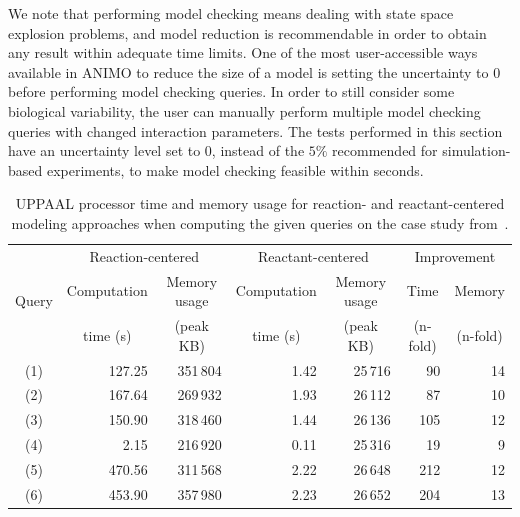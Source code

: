 \documentclass{llncs}
\begin{document}
We note that performing model checking means dealing with state space explosion problems,
and model reduction is recommendable in order to obtain any result within adequate time limits. One of the
most user-accessible ways available in ANIMO to reduce the size of a model is setting the uncertainty to 0
before performing model checking queries.
In order to still consider some biological variability, the user can manually perform multiple model checking queries with changed interaction parameters.
The tests performed in this section have an uncertainty level set to 0, instead of the $5\%$ recommended for simulation-based experiments, to
make model checking feasible within seconds.


\begin{table}[htbp]
  \begin{center}
    \begin{tabular}{|c||r|r||r|r||r|r|}
      \hline
       \multirow{3}{*}{Query} & \multicolumn{2}{c||}{Reaction-centered}	   & \multicolumn{2}{c||}{Reactant-centered} & \multicolumn{2}{c|}{Improvement}\\
      \cline{2-7}
       & \multicolumn{1}{c|}{Computation} & \multicolumn{1}{c||}{Memory usage} & \multicolumn{1}{c|}{Computation} & \multicolumn{1}{c||}{Memory usage} & \multicolumn{1}{c|}{Time} & \multicolumn{1}{c|}{Memory} \\
       & \multicolumn{1}{c|}{time (s)}    & \multicolumn{1}{c||}{(peak KB)}    & \multicolumn{1}{c|}{time (s)} & \multicolumn{1}{c||}{(peak KB)} & \multicolumn{1}{c|}{(n-fold)} & \multicolumn{1}{c|}{(n-fold)}\\
      \hline
      \hline
      (1) & 127.25 & 351\,{}804 & 1.42 & 25\,{}716 & 90 & 14 \\
      \hline
      (2) & 167.64 & 269\,{}932 & 1.93 & 26\,{}112 & 87 & 10 \\
      \hline
      (3) & 150.90 & 318\,{}460 & 1.44 & 26\,{}136 & 105 & 12 \\
      \hline
      (4) & 2.15 & 216\,{}920 & 0.11 & 25\,{}316 & 19 & 9 \\
      \hline
      (5) & 470.56 & 311\,{}568 & 2.22 & 26\,{}648 & 212 & 12 \\
      \hline
      (6) & 453.90 & 357\,{}980 & 2.23 & 26\,{}652 & 204 & 13 \\
      \hline
    \end{tabular}
  \end{center}
  \caption{UPPAAL processor time and memory usage for reaction- and reactant-centered modeling approaches when computing
  the given queries on the case study from~\cite{animo-ieee}.\label{tab:model-checking}}
\end{table}
\end{document}

